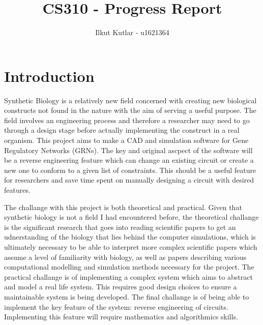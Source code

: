 \documentclass{article}
\author{Ilkut Kutlar - u1621364}
\title{CS310 - Progress Report}
\begin{document}
	\maketitle
	\tableofcontents
	
	\newpage
	
	\section{Introduction}
	
	Synthetic Biology is a relatively new field concerned with creating new biological constructs not found in the nature with the aim of serving a useful purpose. The field involves an engineering process and therefore a researcher may need to go through a design stage before actually implementing the construct in a real organism. This project aims to make a CAD and simulation software for Gene Regulatory Networks (GRNs). The key and original ascpect of the software will be a reverse engineering feature which can change an existing circuit or create a new one to conform to a given list of constraints. This should be a useful feature for researchers and save time spent on manually designing a circuit with desired features.
	
	
	The challange with this project is both theoretical and practical. Given that synthetic biology is not a field I had encountered before, the theoretical challange is the significant research that goes into reading scientific papers to get an udnerstanding of the biology that lies behind the computer simulations, which is ultimately necessary to be able to interpret more complex scientific papers which assume a level of familiarity with biology, as well as papers describing various computational modelling and simulation methods necessary for the project. The practical challange is of implementing a complex system which aims to abstract and model a real life system. This requires good design choices to ensure a maintainable system is being developed. The final challange is of being able to implement the key feature of the system: reverse engineering of circuits. Implementing this feature will require mathematics and algorithmics skills.
	
\end{document}
